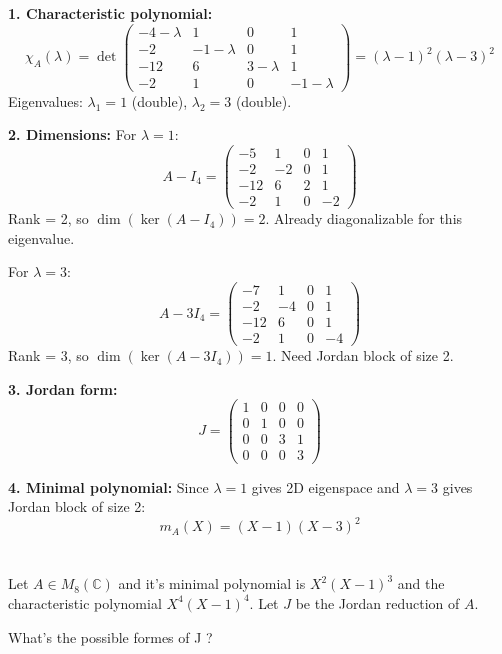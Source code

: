 \documentclass[12pt]{article}
\begin{document}
\begin{correctionbox}
\textbf{1. Characteristic polynomial:}
\[
\chi_A(\lambda) = \det\begin{pmatrix}
-4-\lambda & 1 & 0 & 1 \\
-2 & -1-\lambda & 0 & 1 \\
-12 & 6 & 3-\lambda & 1 \\
-2 & 1 & 0 & -1-\lambda
\end{pmatrix} = (\lambda-1)^2(\lambda-3)^2
\]
Eigenvalues: $\lambda_1 = 1$ (double), $\lambda_2 = 3$ (double).

\textbf{2. Dimensions:}
For $\lambda = 1$:
\[
A - I_4 = \begin{pmatrix} -5 & 1 & 0 & 1 \\ -2 & -2 & 0 & 1 \\ -12 & 6 & 2 & 1 \\ -2 & 1 & 0 & -2 \end{pmatrix}
\]
Rank = 2, so $\dim(\ker(A-I_4)) = 2$. Already diagonalizable for this eigenvalue.

For $\lambda = 3$:
\[
A - 3I_4 = \begin{pmatrix} -7 & 1 & 0 & 1 \\ -2 & -4 & 0 & 1 \\ -12 & 6 & 0 & 1 \\ -2 & 1 & 0 & -4 \end{pmatrix}
\]
Rank = 3, so $\dim(\ker(A-3I_4)) = 1$. Need Jordan block of size 2.

\textbf{3. Jordan form:}
\[
J = \begin{pmatrix} 1 & 0 & 0 & 0 \\ 0 & 1 & 0 & 0 \\ 0 & 0 & 3 & 1 \\ 0 & 0 & 0 & 3 \end{pmatrix}
\]

\textbf{4. Minimal polynomial:}
Since $\lambda=1$ gives 2D eigenspace and $\lambda=3$ gives Jordan block of size 2:
\[
m_A(X) = (X-1)(X-3)^2
\]
\end{correctionbox}

\section{}
Let $A \in M_8(\mathbb{C})$ and it's minimal polynomial is $X^2(X-1)^3$ and the characteristic polynomial $X^4(X-1)^4$. Let $J$ be the Jordan reduction of $A$.

What's the possible formes of J ?
\end{document}
